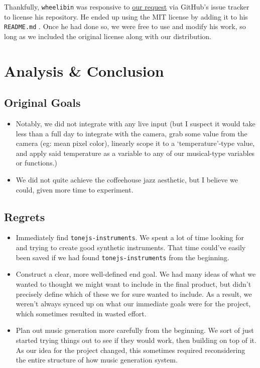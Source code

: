 \documentclass[12pt,a4paper]{article}
\newcommand{\code}{\texttt}
\newcommand{\lightcode}[1]{\colorbox{light-gray}{\texttt{#1}}}
\begin{document}
Thankfully, \code{wheelibin} was responsive to \href{https://github.com/wheelibin/synaesthesia/issues/2}{our request} via GitHub's issue tracker to license his repository. He ended up using the MIT license by adding it to his \code{README.md} \cite{synaesthesia-license}. Once he had done so, we were free to use and modify his work, so long as we included the original license along with our distribution.


\pagebreak
\section{Analysis \& Conclusion}
\subsection{Original Goals}
\begin{itemize}
	\item Notably, we did not integrate with any live input (but I suspect it would take less than a full day to integrate with the camera, grab some value from the camera (eg: mean pixel color), linearly scope it to a `temperature'-type value, and apply said temperature as a variable to any of our musical-type variables or functions.)
	\item We did not quite achieve the coffeehouse jazz aesthetic, but I believe we could, given more time to experiment.
\end{itemize}

\subsection{Regrets}
\begin{itemize}
	\item Immediately find \lightcode{tonejs-instruments}. We spent a lot of time looking for and trying to create good synthetic instruments. That time could've easily been saved if we had found \lightcode{tonejs-instruments} from the beginning.
	\item Construct a clear, more well-defined end goal. We had many ideas of what we wanted to thought we might want to include in the final product, but didn't precisely define which of these we for sure wanted to include. As a result, we weren't always synced up on what our immediate goals were for the project, which sometimes resulted in wasted effort.
	\item Plan out music generation more carefully from the beginning. We sort of just started trying things out to see if they would work, then building on top of it. As our idea for the project changed, this sometimes required reconsidering the entire structure of how music generation system.
\end{itemize}
\end{document}
